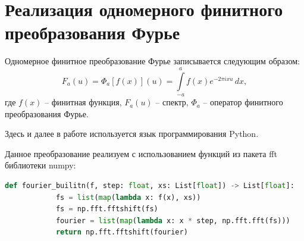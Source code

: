 \section{Реализация одномерного финитного преобразования Фурье}
{
    Одномерное финитное преобразование Фурье записывается следующим образом:
    \begin{equation}\label{fin_transform}
        F_a(u) = \Phi_a \left[ f(x) \right] (u) = \int\limits_{-a}^{a} f(x) e^{-2 \pi i x u} \,dx,
    \end{equation}
    	где $f(x)$ -- финитная функция, $F_a(u)$ -- спектр, $\Phi_a$ -- оператор финитного преобразования Фурье.
    	
    	Здесь и далее в работе используется язык программирования Python.
    	
    	Данное преобразование реализуем с использованием функций из пакета fft библиотеки numpy:
    	
    	\begin{lstlisting}[frame=single,language=Python,mathescape=true] 
    	def fourier_builitn(f, step: float, xs: List[float]) -> List[float]:
	    	fs = list(map(lambda x: f(x), xs))
	    	fs = np.fft.fftshift(fs)
	    	fourier = list(map(lambda x: x * step, np.fft.fft(fs)))
	    	return np.fft.fftshift(fourier)
    	\end{lstlisting}
}
\newpage

